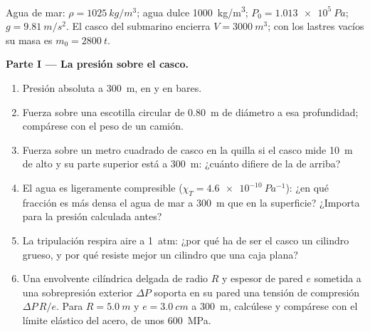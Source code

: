 \begin{problem}
\label{pb:b1:fluid-statics:1}
Agua de mar: $\rho = \qty{1025}{kg/m^3}$; agua dulce \qty{1000}{kg/m^3};
$P_0 = \qty{1.013e5}{Pa}$; $g = \qty{9.81}{m/s^2}$. El casco del submarino
encierra $V = \qty{3000}{m^3}$; con los lastres vacíos su masa es
$m_0 = \qty{2800}{t}$.

\medskip
\noindent\textbf{Parte I --- La presión sobre el casco.}
\begin{enumerate}
  \item Presión absoluta a \qty{300}{m}, en  y en bares.
  \item Fuerza sobre una escotilla circular de \qty{0.80}{m} de diámetro a
        esa profundidad; compárese con el peso de un camión.
  \item Fuerza sobre un metro cuadrado de casco en la quilla si el casco
        mide \qty{10}{m} de alto y su parte superior está a \qty{300}{m}:
        ¿cuánto difiere de la de arriba?
  \item El agua es ligeramente compresible ($\chi_T = \qty{4.6e-10}{Pa^{-1}}$):
        ¿en qué fracción es más densa el agua de mar a \qty{300}{m} que en
        la superficie? ¿Importa para la presión calculada antes?
  \item La tripulación respira aire a \qty{1}{atm}: ¿por qué ha de ser el
        casco un cilindro grueso, y por qué resiste mejor un cilindro que
        una caja plana?
  \item Una envolvente cilíndrica delgada de radio $R$ y espesor de pared $e$
        sometida a una sobrepresión exterior $\Delta P$ soporta en su pared
        una tensión de compresión $\Delta P\,R/e$. Para $R = \qty{5.0}{m}$ y
        $e = \qty{3.0}{cm}$ a \qty{300}{m}, calcúlese y compárese con el
        límite elástico del acero, de unos \qty{600}{MPa}.
\end{enumerate}


\end{problem}
